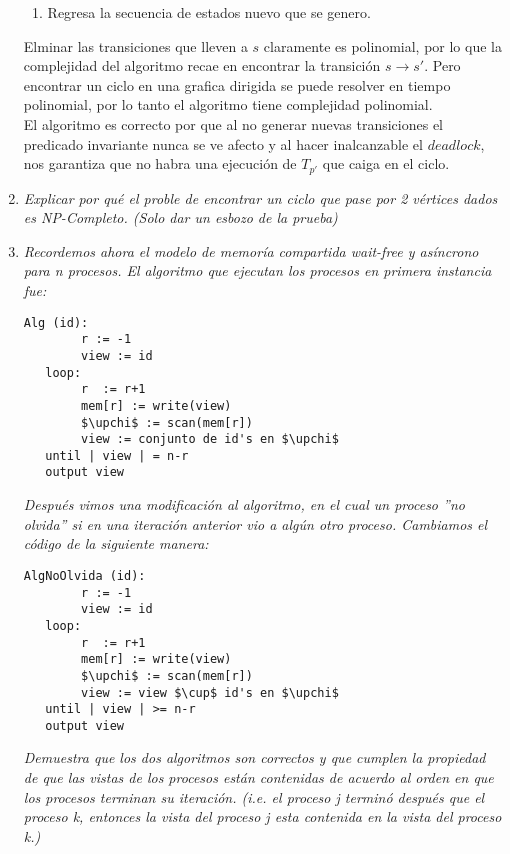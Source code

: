 \documentclass{article}
\begin{document}
\begin{enumerate}
{\begin{enumerate}
  \item{Regresa la secuencia de estados nuevo que se genero.} 
\end{enumerate}

Elminar las transiciones que lleven a $s$ claramente es polinomial,
por lo que la complejidad del algoritmo recae en encontrar la
transición $s \rightarrow s'$. Pero encontrar un ciclo en una grafica
dirigida se puede resolver en tiempo polinomial, por lo tanto el
algoritmo tiene complejidad polinomial.\\

El algoritmo es correcto por que al no generar nuevas transiciones el
predicado invariante nunca se ve afecto y al hacer inalcanzable el
$deadlock$, nos garantiza que no habra una ejecución de $T_{p'}$ que
caiga en el ciclo.
}

\item{
  \textsl{
        Explicar por qué el proble de encontrar un ciclo que pase por
        2 vértices dados es NP-Completo. (Solo dar un esbozo de la
        prueba)
      }
    }

  \item{
      \textsl{
        Recordemos ahora el modelo de memoría compartida wait-free y
        asíncrono para n procesos. El algoritmo que ejecutan los
        procesos en primera instancia fue:
      }
      \begin{lstlisting}[frame=single,mathescape]
Alg (id):
        r := -1
        view := id
   loop:
        r  := r+1
        mem[r] := write(view)
        $\upchi$ := scan(mem[r])
        view := conjunto de id's en $\upchi$
   until | view | = n-r
   output view
      \end{lstlisting}
      \textsl{
        Después vimos una modificación al algoritmo, en el cual un
        proceso ''no olvida'' si en una iteración anterior vio a algún
        otro proceso. Cambiamos el código de la siguiente manera:
      }
\begin{lstlisting}[frame=single,mathescape]
AlgNoOlvida (id):
        r := -1
        view := id
   loop:
        r  := r+1
        mem[r] := write(view)
        $\upchi$ := scan(mem[r])
        view := view $\cup$ id's en $\upchi$
   until | view | >= n-r
   output view
      \end{lstlisting}
      \textsl{
        Demuestra que los dos algoritmos son correctos y que cumplen
        la propiedad de que las vistas de los procesos están
        contenidas de acuerdo al orden en que los procesos terminan su
        iteración. (i.e. el proceso j terminó después que el proceso
        k, entonces la vista del proceso j esta contenida en la vista
        del proceso k.)\\
      }

}
\end{enumerate}
\end{document}
